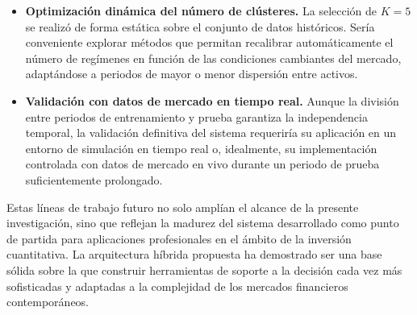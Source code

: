 \begin{itemize}
    \item \textbf{Optimización dinámica del número de clústeres.} La 
    selección de $K=5$ se realizó de forma estática sobre el conjunto 
    de datos históricos. Sería conveniente explorar métodos que 
    permitan recalibrar automáticamente el número de regímenes en 
    función de las condiciones cambiantes del mercado, adaptándose a 
    periodos de mayor o menor dispersión entre activos.

    \item \textbf{Validación con datos de mercado en tiempo real.} 
    Aunque la división entre periodos de entrenamiento y prueba 
    garantiza la independencia temporal, la validación definitiva del 
    sistema requeriría su aplicación en un entorno de simulación en 
    tiempo real o, idealmente, su implementación controlada con datos 
    de mercado en vivo durante un periodo de prueba suficientemente 
    prolongado.

\end{itemize}

Estas líneas de trabajo futuro no solo amplían el alcance de la 
presente investigación, sino que reflejan la madurez del sistema 
desarrollado como punto de partida para aplicaciones profesionales en 
el ámbito de la inversión cuantitativa. La arquitectura híbrida 
propuesta ha demostrado ser una base sólida sobre la que construir 
herramientas de soporte a la decisión cada vez más sofisticadas y 
adaptadas a la complejidad de los mercados financieros contemporáneos.